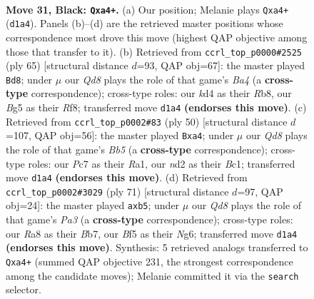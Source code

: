 \documentclass[11pt]{article}
\begin{document}
\clearpage

\begin{figure}[p]\centering
\begin{subfigure}{0.46\textwidth}\centering
\resizebox{\linewidth}{!}{%
\newchessgame
\chessboard[
  setfen={r3r3/1pp3kp/5p2/3p1bb1/P2K4/N1B1P3/P2N1P2/R2q4 b - - 4 31},
  showmover=false,
  pgfstyle=straightmove, color=movearrow, markmove={d1-a4}
]}
\caption{}
\end{subfigure}\hfill
\begin{subfigure}{0.46\textwidth}\centering
\resizebox{\linewidth}{!}{%
\newchessgame
\chessboard[
  setfen={1r3r1k/1P4pp/R2p4/b1qNp3/2B1b3/6P1/Q4P1P/5RK1 b - - 8 33},
  showmover=false,
  pgfstyle=straightmove, color=movearrow, markmove={a5-d8}
]}
\caption{}
\end{subfigure}
\\[4pt]
\begin{subfigure}{0.46\textwidth}\centering
\resizebox{\linewidth}{!}{%
\newchessgame
\chessboard[
  setfen={5k2/p4pp1/1r2pn1p/1Bb5/p6P/6P1/1PP1RPK1/R1Br4 w - - 2 26},
  showmover=false,
  pgfstyle=straightmove, color=movearrow, markmove={b5-a4}
]}
\caption{}
\end{subfigure}\hfill
\begin{subfigure}{0.46\textwidth}\centering
\resizebox{\linewidth}{!}{%
\newchessgame
\chessboard[
  setfen={6k1/1b3pp1/p5np/1P1r4/1pN2P2/1P4P1/4B2P/3R1K2 b - - 0 36},
  showmover=false,
  pgfstyle=straightmove, color=movearrow, markmove={a6-b5}
]}
\caption{}
\end{subfigure}
\caption{\textbf{Move 31, Black: \texttt{Qxa4+}.} (a) Our position; Melanie plays \texttt{Qxa4+} (\texttt{d1a4}). Panels (b)--(d) are the retrieved master positions whose correspondence most drove this move (highest QAP objective among those that transfer to it). (b) Retrieved from \texttt{ccrl\_top\_p0000\#2525} (ply 65) [structural distance $d$=93, QAP obj=67]: the master played \texttt{Bd8}; under $\mu$ our \emph{Qd8} plays the role of that game's \emph{Ba4} (a \textbf{cross-type} correspondence); cross-type roles: our \emph{k}d4 as their \emph{R}b8, our \emph{B}g5 as their \emph{R}f8; transferred move \texttt{d1a4} \textbf{(endorses this move)}. (c) Retrieved from \texttt{ccrl\_top\_p0002\#83} (ply 50) [structural distance $d$=107, QAP obj=56]: the master played \texttt{Bxa4}; under $\mu$ our \emph{Qd8} plays the role of that game's \emph{Bb5} (a \textbf{cross-type} correspondence); cross-type roles: our \emph{P}c7 as their \emph{R}a1, our \emph{n}d2 as their \emph{B}c1; transferred move \texttt{d1a4} \textbf{(endorses this move)}. (d) Retrieved from \texttt{ccrl\_top\_p0002\#3029} (ply 71) [structural distance $d$=97, QAP obj=24]: the master played \texttt{axb5}; under $\mu$ our \emph{Qd8} plays the role of that game's \emph{Pa3} (a \textbf{cross-type} correspondence); cross-type roles: our \emph{R}a8 as their \emph{B}b7, our \emph{B}f5 as their \emph{N}g6; transferred move \texttt{d1a4} \textbf{(endorses this move)}. Synthesis: 5 retrieved analogs transferred to \texttt{Qxa4+} (summed QAP objective 231, the strongest correspondence among the candidate moves); Melanie committed it via the \texttt{search} selector.}
\label{fig:thought-m61}
\end{figure}
\end{document}
